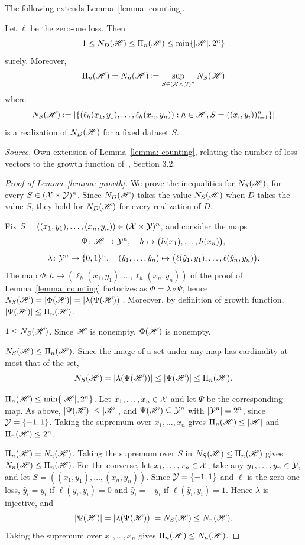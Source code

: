 \documentclass[reqno]{amsart}
\begin{document}
The following extends Lemma~\ref{lemma: counting}.

\begin{lemma}\label{lemma: growth}
Let $\ell$ be the zero-one loss. Then
\[
 1\le N_D(\mathscr{H})\le\Pi_{n}(\mathscr{H})\le\min\{\vert \mathscr{H} \vert,2^n\}
\]
surely. Moreover,
\[
\Pi_n(\mathscr{H})  = N_n(\mathscr{H}) \coloneq \sup_{S\in{(\mathcal{X}\times\mathcal{Y})}^n} N_S(\mathscr{H})
\]
where \[ 
N_S(\mathscr{H}):= \left\vert\{(\ell_h(x_1,y_1),\ldots,\ell_h(x_n,y_n)):h\in\mathscr{H}, S = ((x_i,y_i))_{i=1}^n\}\right\vert 
\] is a realization of $N_D(\mathscr{H})$ for a fixed dataset $S$. 

\textnormal{\emph{Source.} Own extension of Lemma~\ref{lemma: counting}, relating the number of loss vectors to the growth function of~\cite{mohri2018foundations}, Section 3.2.}

\begin{proof}[Proof of Lemma~\ref{lemma: growth}]
We prove the inequalities for $N_S(\mathscr{H})$, for every $S\in(\mathcal{X}\times\mathcal{Y})^n$. Since $N_D(\mathscr{H})$ takes the value $N_S(\mathscr{H})$ when $D$ takes the value $S$, they hold for $N_D(\mathscr{H})$ for every realization of $D$.

Fix $S=((x_1,y_1),\ldots,(x_n,y_n))\in(\mathcal{X}\times\mathcal{Y})^n$, and consider the maps
\[
\Psi\colon\mathscr{H}\to\mathcal{Y}^n,\quad h\mapsto\bigl(h(x_1),\ldots,h(x_n)\bigr),
\]
\[
\lambda\colon\mathcal{Y}^n\to\{0,1\}^n,\quad (\hat y_1,\ldots,\hat y_n)\mapsto\bigl(\ell(\hat y_1,y_1),\ldots,\ell(\hat y_n,y_n)\bigr).
\]
The map $\Phi\colon h\mapsto(\ell_h(x_1,y_1),\ldots,\ell_h(x_n,y_n))$ of the proof of Lemma~\ref{lemma: counting} factorizes as $\Phi=\lambda\circ\Psi$, hence $N_S(\mathscr{H}) = |\Phi(\mathscr{H})| = |\lambda(\Psi(\mathscr{H}))|$. Moreover, by definition of growth function, $|\Psi(\mathscr{H})|\le\Pi_n(\mathscr{H})$.

\emph{$1\le N_S(\mathscr{H})$.} Since $\mathscr{H}$ is nonempty, $\Phi(\mathscr{H})$ is nonempty.

\emph{$N_S(\mathscr{H})\le\Pi_n(\mathscr{H})$.} Since the image of a set under any map has cardinality at most that of the set,
\[
N_S(\mathscr{H}) = |\lambda(\Psi(\mathscr{H}))| \le |\Psi(\mathscr{H})| \le \Pi_n(\mathscr{H}).
\]

\emph{$\Pi_n(\mathscr{H})\le\min\{\vert\mathscr{H}\vert,2^n\}$.} Let $x_1,\ldots,x_n\in\mathcal{X}$ and let $\Psi$ be the corresponding map. As above, $|\Psi(\mathscr{H})|\le\vert\mathscr{H}\vert$, and $\Psi(\mathscr{H})\subseteq\mathcal{Y}^n$ with $|\mathcal{Y}^n| = 2^n$, since $\mathcal{Y}=\{-1,1\}$. Taking the supremum over $x_1,\ldots,x_n$ gives $\Pi_n(\mathscr{H})\le\vert\mathscr{H}\vert$ and $\Pi_n(\mathscr{H})\le2^n$.

\emph{$\Pi_n(\mathscr{H}) = N_n(\mathscr{H})$.} Taking the supremum over $S$ in $N_S(\mathscr{H})\le\Pi_n(\mathscr{H})$ gives $N_n(\mathscr{H})\le\Pi_n(\mathscr{H})$. For the converse, let $x_1,\ldots,x_n\in\mathcal{X}$, take any $y_1,\ldots,y_n\in\mathcal{Y}$, and let $S=((x_1,y_1),\ldots,(x_n,y_n))$. Since $\mathcal{Y}=\{-1,1\}$ and $\ell$ is the zero-one loss, $\hat y_i = y_i$ if $\ell(\hat y_i,y_i)=0$ and $\hat y_i = -y_i$ if $\ell(\hat y_i,y_i)=1$. Hence $\lambda$ is injective, and
\[
|\Psi(\mathscr{H})| = |\lambda(\Psi(\mathscr{H}))| = N_S(\mathscr{H}) \le N_n(\mathscr{H}).
\]
Taking the supremum over $x_1,\ldots,x_n$ gives $\Pi_n(\mathscr{H})\le N_n(\mathscr{H})$.
\end{proof}
\end{lemma}
 
\end{document}
